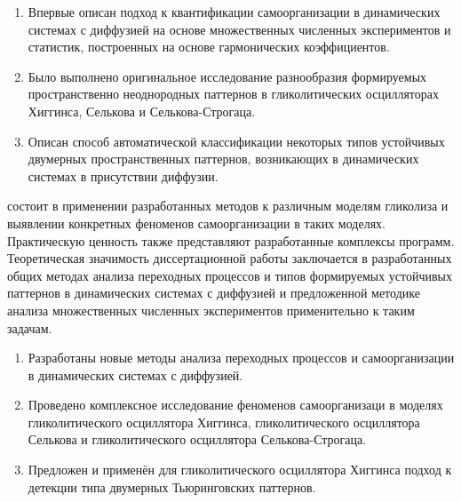 {\novelty}
\begin{enumerate}[beginpenalty=10000] %
  \item Впервые описан подход к квантификации самоорганизации в динамических системах с диффузией на основе множественных численных экспериментов и статистик, построенных на основе гармонических коэффициентов.
  \item Было выполнено оригинальное исследование разнообразия формируемых пространственно неоднородных паттернов в гликолитических осцилляторах Хиггинса, Селькова и Селькова-Строгаца. 
  \item Описан способ автоматической классификации некоторых типов устойчивых двумерных пространственных паттернов, возникающих в динамических системах в присутствии диффузии.
\end{enumerate}

{\influence} состоит в применении разработанных методов к различным моделям гликолиза и выявлении конкретных феноменов самоорганизации в таких моделях. Практическую ценность также представляют разработанные комплексы программ. Теоретическая значимость диссертационной работы заключается в разработанных общих методах анализа переходных процессов и типов формируемых устойчивых паттернов в динамических системах с диффузией и предложенной методике анализа множественных численных экспериментов применительно к таким задачам. 

{}
\begin{enumerate}[beginpenalty=10000] %
  \item Разработаны новые методы анализа переходных процессов и самоорганизации в динамических системах с диффузией.
  \item Проведено комплексное исследование феноменов самоорганизаци в моделях гликолитического осциллятора Хиггинса, гликолитического осциллятора Селькова и гликолитического осциллятора Селькова-Строгаца.
  \item Предложен и применён для гликолитического осциллятора Хиггинса подход к детекции типа двумерных Тьюринговских паттернов.
\end{enumerate}

